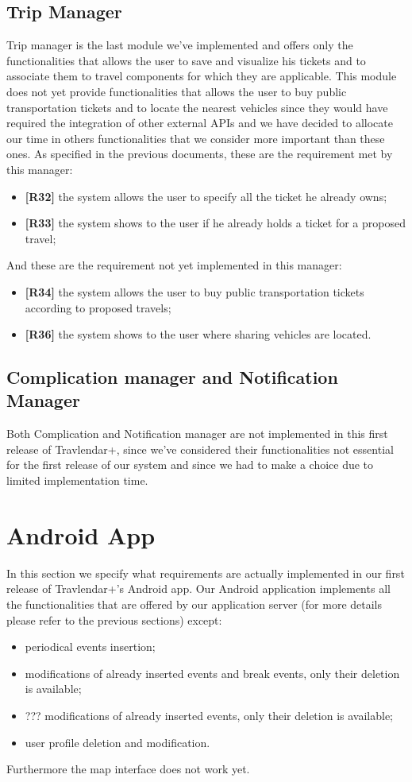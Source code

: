 \subsection{Trip Manager}
Trip manager is the last module we've implemented and offers only the functionalities that allows the user to save and visualize his tickets and to associate them to travel components for which they are applicable.
This module does not yet provide functionalities that allows the user to buy public transportation tickets and to locate the nearest vehicles since they would have required the integration of other external APIs and we have decided to allocate our time in others functionalities that we consider more important than these ones.
As specified in the previous documents, these are the requirement met by this manager:
\begin{itemize}
	\item \textbf{[R32]} the system allows the user to specify all the ticket he already owns;
	\item \textbf{[R33]} the system shows to the user if he already holds a ticket for a proposed travel;
\end{itemize}
And these are the requirement not yet implemented in this manager:
\begin{itemize}
	\item \textbf{[R34]} the system allows the user to buy public transportation tickets according to proposed travels;
	\item \textbf{[R36]} the system shows to the user where sharing vehicles are located.
\end{itemize}

\subsection{Complication manager and Notification Manager}
Both Complication and Notification manager are not implemented in this first release of Travlendar+, since we've considered their functionalities not essential for the  first release of our system and since we had to make a choice due to limited implementation time. 

\section{Android App}
\label{sec:AndroidApp}
In this section we specify what requirements are actually implemented in our first release of Travlendar+'s Android app.
Our Android application implements all the functionalities that are offered by our application server (for more details please refer to the previous sections) except: 
\begin{itemize}
	\item periodical events insertion;
	\item modifications of already inserted events and break events, only their deletion is available;
	\item ???  modifications of already inserted events, only their deletion is available;
	\item user profile deletion and modification.
\end{itemize}
Furthermore the map interface does not work yet.

